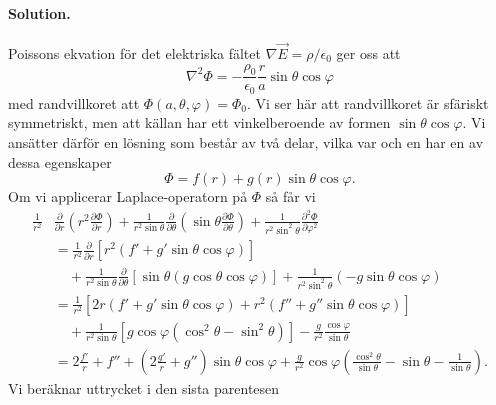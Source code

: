 \documentclass[%
oneside,                 %
final,                   %
10pt]{article}
\newenvironment{doconceexercise}{}{}
\begin{document}
\begin{doconceexercise}


\paragraph{Solution.}
Poissons ekvation för det elektriska fältet $\nabla \vec{E} = \rho / \epsilon_0$ ger oss att
\begin{equation}
  \nabla^2 \Phi = - \frac{\rho_0}{\epsilon_0} \frac{r}{a} \sin \theta \cos
\varphi
\end{equation}
med randvillkoret att $\Phi\left(a,\theta,\varphi\right) = \Phi_0$.
Vi ser här att randvillkoret är sfäriskt symmetriskt, men att 
källan har ett vinkelberoende av formen $\sin \theta \cos \varphi$.  Vi
ansätter därför en lösning som består av två delar, vilka
var och en har en av dessa egenskaper
\begin{equation}
  \Phi = f\left(r\right) + g\left(r\right) \sin \theta \cos \varphi.
\end{equation}
Om vi applicerar Laplace-operatorn på $\Phi$ så får vi
\begin{align}
  \frac{1}{r^2} & \frac{\partial}{\partial r}\left(r^2
\frac{\partial \Phi}{\partial r}\right) + \frac{1}{r^2\sin \theta} 
\frac{\partial}{\partial \theta}\left(\sin \theta 
\frac{\partial \Phi}{\partial \theta}\right) + \frac{1}{r^2 \sin^2 \theta}
\frac{\partial^2 \Phi}{\partial \varphi^2} \nonumber \\
&= \frac{1}{r^2} 
\frac{\partial}{\partial r}\left[r^2\left(f' + g' \sin\theta \cos \varphi\right)
\right] \nonumber \\
& \quad + \frac{1}{r^2 \sin \theta} \frac{\partial}{\partial \theta} \left[
\sin \theta\left( g \cos \theta \cos\varphi\right)\right]
+ \frac{1}{r^2 \sin^2 \theta} \left(-g \sin \theta \cos \varphi\right)
\nonumber \\
&=
\frac{1}{r^2}\left[2r\left(f' + g' \sin \theta \cos \varphi\right) + r^2
\left(f'' + g'' \sin \theta \cos \varphi\right)\right] \nonumber \\
& \quad + \frac{1}{r^2 \sin \theta} \left[g \cos \varphi \left(\cos^2 \theta - \sin^2
\theta\right)\right]- \frac{g}{r^2} \frac{\cos \varphi}{\sin \theta}
\nonumber \\
&= 2 \frac{f'}{r} + f'' + \left(2 \frac{g'}{r} + g''\right) \sin \theta
\cos \varphi + \frac{g}{r^2}\cos \varphi \left( 
\frac{\cos^2 \theta}{\sin \theta} - \sin \theta - \frac{1}{\sin \theta}\right).
\end{align}
Vi beräknar uttrycket i den sista parentesen

\end{doconceexercise}
\end{document}
